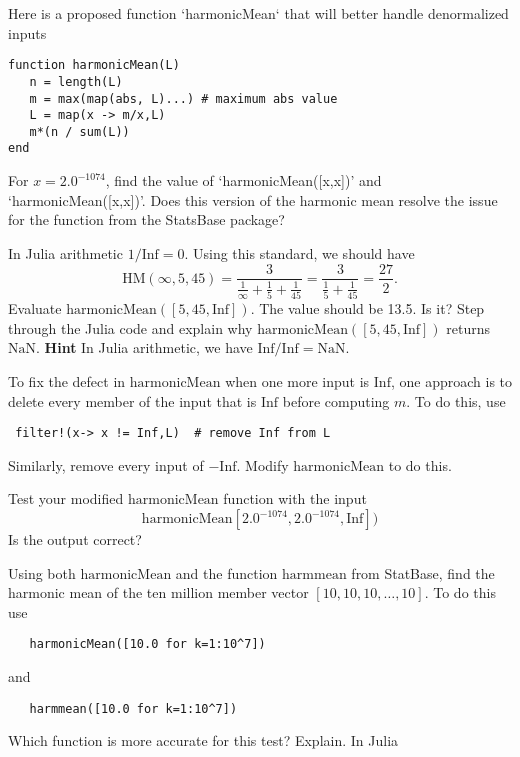 \documentclass[12pt,fleqn]{exam}
\newcommand{\HM}{\mathrm{HM}}
\newcommand{\Inf}{\mathrm{Inf}}
\begin{document}
Here is a proposed function `harmonicMean` that will better handle denormalized inputs
\begin{verbatim}
function harmonicMean(L)
   n = length(L)
   m = max(map(abs, L)...) # maximum abs value
   L = map(x -> m/x,L)  
   m*(n / sum(L))
end
\end{verbatim}


\begin{questions}  
\question[1] For $x = 2.0^{-1074}$, find the value of `harmonicMean([x,x])'  and `harmonicMean([x,x])'. Does this
version of the harmonic mean resolve the issue for the function from the StatsBase package?


\question[1] In Julia arithmetic $1/\Inf = 0$.  Using this standard, we should have
  \begin{equation*}
  \HM(\infty, 5,45) = \frac{3}{\frac{1}{\infty} +  \frac{1}{5} + \frac{1}{45} } =
                           \frac{3}{\frac{1}{5} + \frac{1}{45} }
                           = \frac{27}{2}.
\end{equation*}
Evaluate $\mathrm{harmonicMean}([5,45,\Inf])$. The value should be 13.5. Is it?  Step through the Julia code and
explain why $\mathrm{harmonicMean}([5,45,\Inf])$ returns $\mathrm{NaN}$.  \textbf{Hint}  In Julia arithmetic,
we have $\Inf/\Inf = \mathrm{NaN}$.

\question [1] To fix the defect in $\mathrm{harmonicMean}$ when one more input is $\Inf$, one approach is to
delete every member of the input that is $\Inf$ before computing $m$. To do this, use
\begin{verbatim}
 filter!(x-> x != Inf,L)  # remove Inf from L
\end{verbatim}
Similarly, remove every input of $-\Inf$. Modify  $\mathrm{harmonicMean}$  to do this.

\question [1] Test your modified  $\mathrm{harmonicMean}$  function with the input  
\begin{equation}
 \mathrm{harmonicMean}[2.0^{-1074},2.0^{-1074}, \Inf])
 \end{equation}
  Is the output correct? 

\question [1] Using both $\mathrm{harmonicMean}$ and the function $\mathrm{harmmean}$ from StatBase,
find the harmonic mean of the ten million member vector $[10,10, 10, \dots, 10]$. To do this use
\begin{verbatim}
   harmonicMean([10.0 for k=1:10^7])
\end{verbatim}
and
\begin{verbatim}
   harmmean([10.0 for k=1:10^7])
\end{verbatim}
Which function is more accurate for this test? Explain.  In Julia 

\end{questions}
\end{document}

